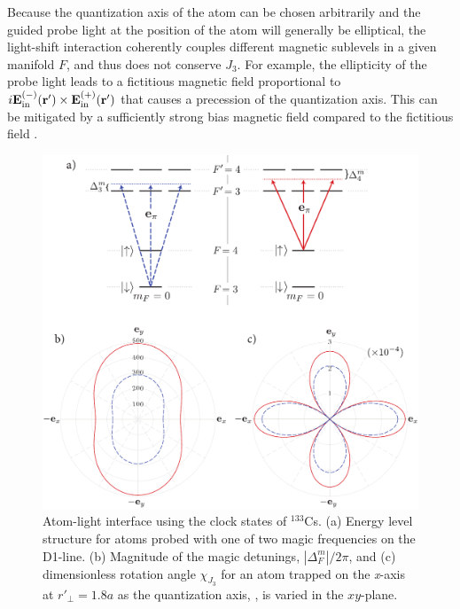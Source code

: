 \documentclass[preprint, aps,pra,onecolumn]{revtex4-1} %
\newcommand{\inp}{{\rm in}}
\newcommand{\chieff}{\chi_{J_3}}
\begin{document}
Because the quantization axis of the atom can be chosen arbitrarily and the guided probe light at the position of the atom will generally be elliptical, the light-shift interaction coherently couples different magnetic sublevels in a given manifold $F$, and thus does not conserve $J_3$.  For example, the ellipticity of the probe light leads to a fictitious magnetic field proportional to $i \mathbf{E}^{(-)}_{\inp}(\br') \times \mathbf{E}^{(+)}_{\inp}(\br')$ that causes a precession of the quantization axis.  This can be mitigated by a sufficiently strong bias magnetic field compared to the fictitious field \cite{smith_continuous_2004}. 


\begin{figure}
\includegraphics[scale=0.44]{./Figs/Fig_MagicFrequencies_alt}
\caption{Atom-light interface using the clock states of $^{133}$Cs.  
(a) Energy level structure for atoms probed with one of two magic frequencies on the D1-line. 
(b) Magnitude of the magic detunings, $|\Delta^m_{F}|/2\pi$, and (c) dimensionless rotation angle $\chieff$ for an atom trapped on the \emph{x}-axis at $ r'\!_\perp=1.8a $ as the quantization axis, , is varied in the $xy$-plane. }\label{Fig::CouplingStrength}
\end{figure}
\end{document}
